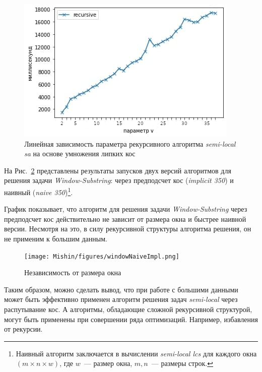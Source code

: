 \begin{figure}[t!]
\centering
    \includegraphics[width=0.8\columnwidth]{Mishin/figures/vDependenceImplicitSemiLocalSARecursie.png}
    \caption{Линейная зависимость параметра рекурсивного алгоритма \emph{semi-local sa} на основе умножения липких кос }\label{fig:vParam}
\end{figure}

На Рис.~\ref{fig:speedWindow3} представлены результаты запусков двух версий алгоритмов для решения задачи \emph{Window-Substring}: через предподсчет кос (\emph{implicit 350}) и наивный (\emph{naive 350})\footnote{Наивный алгоритм заключается в вычислении \emph{semi-local lcs} для каждого окна $(m \times n \times w)$, где $w$~--- размер окна, $m,n$~--- размеры строк.
}.

График  показывает, что алгоритм для решения задачи \emph{Window-Substring} через предподсчет кос действительно не зависит от размера окна и быстрее наивной версии.
Несмотря на это, в силу рекурсивной структуры  алгоритма решения, он не применим к большим данным.

\begin{figure}[t!]
\centering
    \texttt{[image: Mishin/figures/windowNaiveImpl.png]}
    \caption{Независимость от размера окна }\label{fig:speedWindow3}
\end{figure}


Таким образом, можно сделать вывод, что  при работе с большими данными может быть эффективно применен алгоритм решения задач \emph{semi-local} через распутывание кос. 
А алгоритмы, обладающие сложной рекурсивной структурой, могут быть применены при совершении ряда оптимизаций. Например, избавления от рекурсии.


